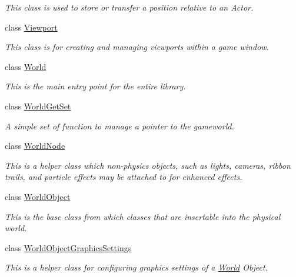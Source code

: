 \begin{DoxyCompactItemize}
\begin{DoxyCompactList}\small\item\em This class is used to store or transfer a position relative to an Actor. \item\end{DoxyCompactList}\item 
class \hyperlink{classMezzanine_1_1Viewport}{Viewport}
\begin{DoxyCompactList}\small\item\em This class is for creating and managing viewports within a game window. \item\end{DoxyCompactList}\item 
class \hyperlink{classMezzanine_1_1World}{World}
\begin{DoxyCompactList}\small\item\em This is the main entry point for the entire library. \item\end{DoxyCompactList}\item 
class \hyperlink{classMezzanine_1_1WorldGetSet}{WorldGetSet}
\begin{DoxyCompactList}\small\item\em A simple set of function to manage a pointer to the gameworld. \item\end{DoxyCompactList}\item 
class \hyperlink{classMezzanine_1_1WorldNode}{WorldNode}
\begin{DoxyCompactList}\small\item\em This is a helper class which non-\/physics objects, such as lights, cameras, ribbon trails, and particle effects may be attached to for enhanced effects. \item\end{DoxyCompactList}\item 
class \hyperlink{classMezzanine_1_1WorldObject}{WorldObject}
\begin{DoxyCompactList}\small\item\em This is the base class from which classes that are insertable into the physical world. \item\end{DoxyCompactList}\item 
class \hyperlink{classMezzanine_1_1WorldObjectGraphicsSettings}{WorldObjectGraphicsSettings}
\begin{DoxyCompactList}\small\item\em This is a helper class for configuring graphics settings of a \hyperlink{classMezzanine_1_1World}{World} Object. \item\end{DoxyCompactList}\item 

\end{DoxyCompactItemize}
